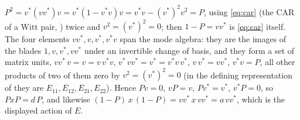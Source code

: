$P^2 = v^*(v v^*)v = v^*(1 - v^* v)v = v^* v - (v^*)^2 v^2 = P$, using \eqref{eq:car} (the CAR of a Witt pair, ) twice and $v^2 = (v^*)^2 = 0$; then $1 - P = vv^*$ is \eqref{eq:car} itself. The four elements $vv^{*}, v, v^{*}, v^{*}v$ span the mode algebra: they are the images of the blades $1, v, v^{*}, vv^{*}$ under an invertible change of basis, and they form a set of matrix units, $vv^{*}\,v = v = v\,v^{*}v$, $v^{*}\,vv^{*} = v^{*} = v^{*}v\,v^{*}$, $v\,v^{*} = vv^{*}$, $v^{*}v = P$, all other products of two of them zero by $v^{2} = (v^{*})^{2} = 0$ (in the defining representation of  they are $E_{11}, E_{12}, E_{21}, E_{22}$). Hence $Pv = 0$, $vP = v$, $Pv^{*} = v^{*}$, $v^{*}P = 0$, so $P x P = d\,P$, and likewise $(1{-}P)\,x\,(1{-}P) = vv^{*}\,x\,vv^{*} = a\,vv^{*}$, which is the displayed action of $E$.
